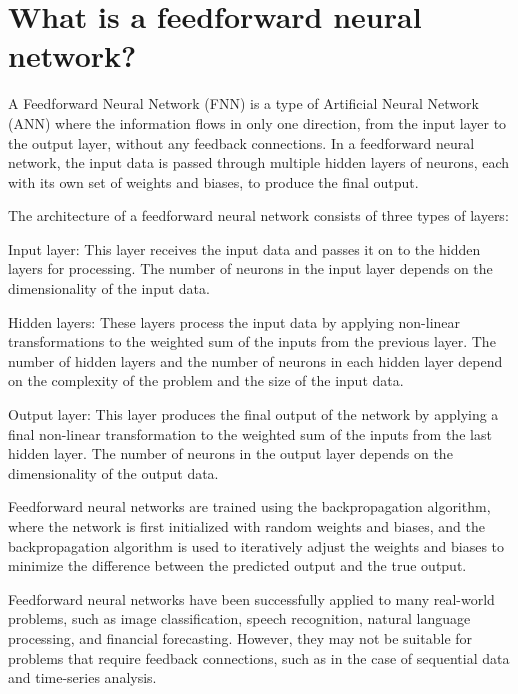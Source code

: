 \section{What is a feedforward neural network?}
A Feedforward Neural Network (FNN) is a type of Artificial Neural Network (ANN) where the information flows in only one direction, from the input layer to the output layer, without any feedback connections. In a feedforward neural network, the input data is passed through multiple hidden layers of neurons, each with its own set of weights and biases, to produce the final output.

The architecture of a feedforward neural network consists of three types of layers:

Input layer: This layer receives the input data and passes it on to the hidden layers for processing. The number of neurons in the input layer depends on the dimensionality of the input data.

Hidden layers: These layers process the input data by applying non-linear transformations to the weighted sum of the inputs from the previous layer. The number of hidden layers and the number of neurons in each hidden layer depend on the complexity of the problem and the size of the input data.

Output layer: This layer produces the final output of the network by applying a final non-linear transformation to the weighted sum of the inputs from the last hidden layer. The number of neurons in the output layer depends on the dimensionality of the output data.

Feedforward neural networks are trained using the backpropagation algorithm, where the network is first initialized with random weights and biases, and the backpropagation algorithm is used to iteratively adjust the weights and biases to minimize the difference between the predicted output and the true output.

Feedforward neural networks have been successfully applied to many real-world problems, such as image classification, speech recognition, natural language processing, and financial forecasting. However, they may not be suitable for problems that require feedback connections, such as in the case of sequential data and time-series analysis.

